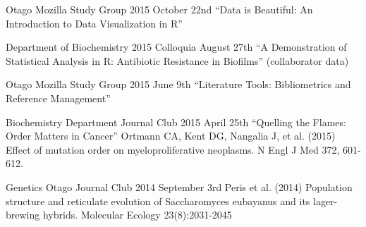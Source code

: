Otago Mozilla Study Group 2015 October 22nd
``Data is Beautiful: An Introduction to Data Visualization in R''

Department of Biochemistry 2015 Colloquia August 27th
``A Demonstration of Statistical Analysis in R: Antibiotic Resistance in Biofilms'' (collaborator data)

Otago Mozilla Study Group 2015 June 9th
``Literature Tools: Bibliometrics and Reference Management''

Biochemistry Department Journal Club 2015 April 25th
``Quelling the Flames: Order Matters in Cancer''
Ortmann CA, Kent DG, Nangalia J, et al. (2015) Effect of mutation order on myeloproliferative neoplasms. N Engl J Med 372, 601-612.

Genetics Otago Journal Club 2014 September 3rd
Peris et al. (2014) Population structure and reticulate evolution of Saccharomyces eubayanus and its lager-brewing hybrids. Molecular Ecology 23(8):2031-2045

\fi


